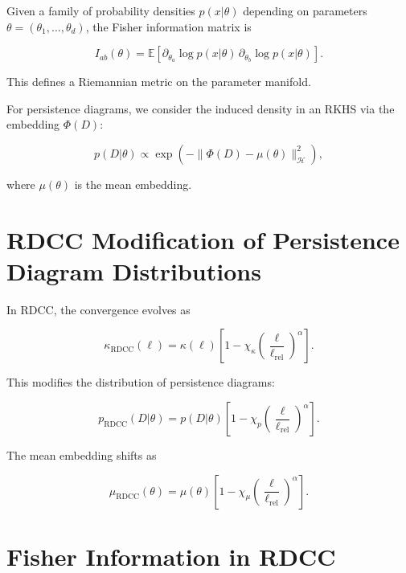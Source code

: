 \documentclass[11pt,a4paper]{article}
\begin{document}
Given a family of probability densities $p(x|\theta)$ depending on parameters 
$\theta = (\theta_{1}, \dots, \theta_{d})$, the Fisher information matrix is

\begin{equation}
    I_{ab}(\theta)
    = \mathbb{E}
      \left[
        \partial_{\theta_{a}} \log p(x|\theta)
        \,
        \partial_{\theta_{b}} \log p(x|\theta)
      \right].
\end{equation}

This defines a Riemannian metric on the parameter manifold.

For persistence diagrams, we consider the induced density in an RKHS via the 
embedding $\Phi(D)$:



\[
    p(D|\theta)
    \propto
    \exp\left(
        - \| \Phi(D) - \mu(\theta) \|_{\mathcal{H}}^{2}
    \right),
\]



where $\mu(\theta)$ is the mean embedding.
\section{RDCC Modification of Persistence Diagram Distributions}

In RDCC, the convergence evolves as

\begin{equation}
    \kappa_{\mathrm{RDCC}}(\ell)
    = \kappa(\ell)
      \left[
        1 - \chi_{\kappa}
        \left(\frac{\ell}{\ell_{\mathrm{rel}}}\right)^{\alpha}
      \right].
\end{equation}

This modifies the distribution of persistence diagrams:



\[
    p_{\mathrm{RDCC}}(D|\theta)
    = p(D|\theta)
      \left[
        1 - \chi_{p}
        \left(\frac{\ell}{\ell_{\mathrm{rel}}}\right)^{\alpha}
      \right].
\]



The mean embedding shifts as



\[
    \mu_{\mathrm{RDCC}}(\theta)
    = \mu(\theta)
      \left[
        1 - \chi_{\mu}
        \left(\frac{\ell}{\ell_{\mathrm{rel}}}\right)^{\alpha}
      \right].
\]


\section{Fisher Information in RDCC}
\end{document}
